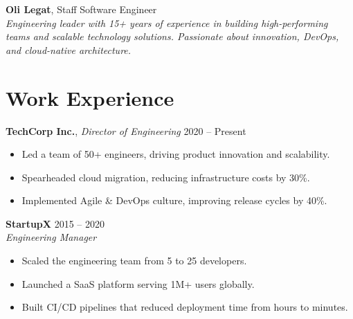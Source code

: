 \documentclass[a4paper,10pt]{article}
\begin{document}
\noindent
\begin{minipage}[t]{0.65\textwidth}
    \hspace{-1.05cm}
    \colorbox{headerbg}{%
    \begin{minipage}[t]{\dimexpr\textwidth + 0.9cm} 
        \vspace{0.5cm} %
        {\color{navy} \LARGE \textbf{Oli Legat}}{\Large, Staff Software Engineer}\\[0.5em]
        \textit{Engineering leader with 15+ years of experience in building high-performing teams and scalable technology solutions. Passionate about innovation, DevOps, and cloud-native architecture.}\\[0.5em]
    \end{minipage}%
    }
    
    \section*{\color{navy} Work Experience}
    \textbf{TechCorp Inc.}, \textit{Director of Engineering} \hfill 2020 -- Present\\
    \begin{itemize}[leftmargin=1.5em, nosep]
        \item Led a team of 50+ engineers, driving product innovation and scalability.
        \item Spearheaded cloud migration, reducing infrastructure costs by 30\%.
        \item Implemented Agile \& DevOps culture, improving release cycles by 40\%.
    \end{itemize}
    
    \vspace{0.5em}
    \textbf{StartupX} \hfill 2015 -- 2020\\
    \textit{Engineering Manager}\\
    \begin{itemize}[leftmargin=1.5em, nosep]
        \item Scaled the engineering team from 5 to 25 developers.
        \item Launched a SaaS platform serving 1M+ users globally.
        \item Built CI/CD pipelines that reduced deployment time from hours to minutes.
    \end{itemize}
    

\end{minipage}
\end{document}
